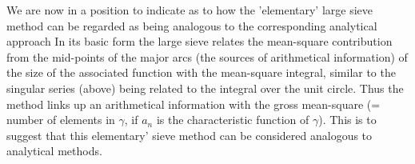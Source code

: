 \begin{enumerate}[1)]
We are now in a position to indicate as to how the 'elementary' large
sieve method can be regarded as being analogous to the corresponding
analytical approach In its basic form the large sieve relates the
mean-square contribution from the mid-points of the major arcs (the
sources of arithmetical information) of the size  of the associated
function with the mean-square integral, similar to the singular series
(above) being related to the integral over the unit circle. Thus the
method links up an arithmetical information with the gross mean-square
(= number of  elements in $\gamma$, if $a_n$ is the characteristic
function of $\gamma$). This is to suggest that this elementary' sieve
method can be considered analogous to analytical methods.  
\end{enumerate}

